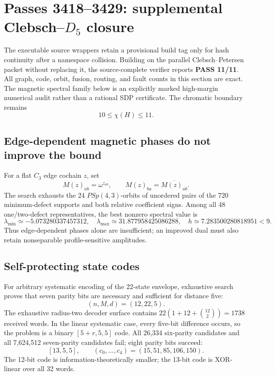 \section{Passes 3418--3429: supplemental Clebsch--\(D_5\) closure}
\label{sec:bt3418-3429-clebsch-d5}

The executable source wrappers retain a provisional build tag only for hash continuity after a namespace collision.  Building on the parallel Clebsch--Petersen packet without replacing it, the source-complete verifier reports \textbf{PASS 11/11}.  All graph, code,
orbit, fusion, routing, and fault counts in this section are exact.  The magnetic
spectral family below is an explicitly marked high-margin numerical audit rather
than a rational SDP certificate.  The chromatic boundary remains
\[
  \boxed{10\leq\chi(H)\leq 11}.
\]

\subsection{Edge-dependent magnetic phases do not improve the bound}
For a flat \(C_3\) edge cochain \(z\), set
\[
 M(z)_{ab}=\omega^{z_{ab}},\qquad M(z)_{ba}=\overline{M(z)_{ab}}.
\]
The search exhausts the 24 \(PSp(4,3)\)-orbits of unordered pairs of the
720 minimum-defect supports and both relative coefficient signs.  Among all
48 one/two-defect representatives, the best nonzero spectral value is
\[
 \lambda_{\min}\simeq-5.073280337457312,
 \quad \lambda_{\max}\simeq31.877958425086288,
 \quad h\simeq7.283500280818951<9.
\]
Thus edge-dependent phases alone are insufficient; an improved dual must also
retain nonseparable profile-sensitive amplitudes.

\subsection{Self-protecting state codes}
For arbitrary systematic encoding of the 22-state envelope, exhaustive search
proves that seven parity bits are necessary and sufficient for distance five:
\[
 \boxed{(n,M,d)=(12,22,5)}.
\]
The exhaustive radius-two decoder surface contains
\(22(1+12+\binom{12}{2})=1738\) received words.  In the linear systematic
case, every five-bit difference occurs, so the problem is a binary
\([5+r,5,5]\) code.  All 26,334 six-parity candidates and all 7,624,512
seven-parity candidates fail; eight parity bits succeed:
\[
 \boxed{[13,5,5]},
 \qquad (c_0,\ldots,c_4)=(15,51,85,106,150).
\]
The 12-bit code is information-theoretically smaller; the 13-bit code is
XOR-linear over all 32 words.

